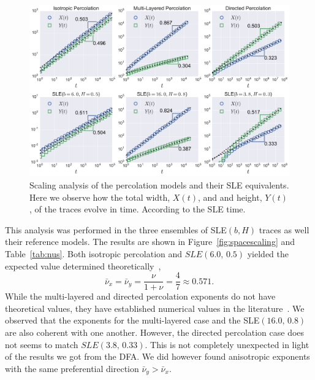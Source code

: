\begin{figure}
\begin{center}
    \includegraphics[width=\textwidth]{chapters/ch6-asle/figs/timescaling}
\end{center}
\caption{Scaling analysis of the percolation models and their SLE equivalents.
    Here we observe how the total width, $X(t)$, and and height, $Y(t)$, of the
    traces evolve in time. According to the SLE time.}
\label{fig:timescaling}
\end{figure}


This analysis was performed in the three ensembles of SLE$(b,H)$ traces as well
their reference models. The results are shown in Figure~\ref{fig:spacescaling}
and Table~\ref{tab:nus}. Both isotropic percolation and $SLE(6.0,\,0.5)$
yielded the expected value determined theoretically~\cite{Ziff1986}, 
\begin{equation}
    \bar{\nu}_x= \bar{\nu}_y= \frac{\nu}{1+\nu}=\frac{4}{7}\approx0.571.
\end{equation}
While the multi-layered and directed percolation exponents do not have
theoretical values, they have established numerical values in the
literature~\cite{Dayan1991, Owczarek1997}. We observed that the exponents for
the multi-layered case and the SLE$(16.0,\,0.8)$ are also coherent with one
another. However, the directed percolation case does not seems to match
$SLE(3.8,\,0.33)$. This is not completely unexpected in light of the
results we got from the DFA\@. We did however found anisotropic exponents with
the same preferential direction $\bar{\nu}_y>\bar{\nu}_x$.




